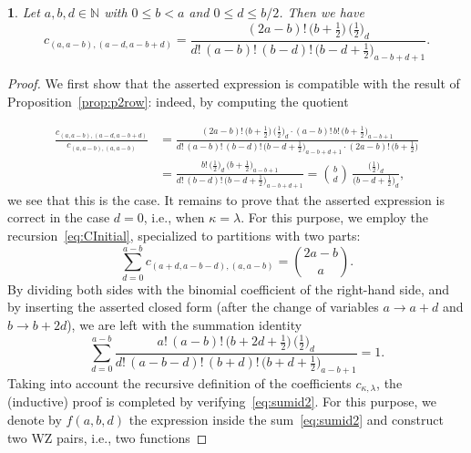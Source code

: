 \documentclass[smallextended]{svjour3}
\newtheorem{thm}{\protect\theoremname}
\providecommand{\theoremname}{Theorem}
\begin{document}
\begin{thm}\label{thm:cf2}
  Let $a,b,d\in\mathbb{N}$ with $0\leq b<a$ and $0\leq d\leq b/2$.
  Then we have
  \[
    c_{(a,a-b),(a-d,a-b+d)} = 
    \frac{(2a-b)! \, \bigl(b+\frac12\bigr) \, \bigl(\frac12\bigr)_{\!d}}
         {d! \, (a-b)! \, (b-d)! \, \bigl(b-d+\frac12\bigr)_{\!a-b+d+1}}.
  \]
\end{thm}
\begin{proof}
  We first show that the asserted expression is compatible with the result of
  Proposition~\ref{prop:p2row}: indeed, by computing the quotient
  
  \begin{align*}
    \frac{c_{(a,a-b),(a-d,a-b+d)}}{c_{(a,a-b),(a,a-b)}} &=
    \frac{(2a-b)! \, \bigl(b+\frac12\bigr) \, \bigl(\frac12\bigr)_{\!d} \cdot
      (a-b)! \, b! \, \bigl(b+\frac12\bigr)_{\!a-b+1}}
      {d! \, (a-b)! \, (b-d)! \, \bigl(b-d+\frac12\bigr)_{\!a-b+d+1} \cdot
        (2a-b)! \, \bigl(b+\frac12\bigr)} \\
    &= \frac{b! \, \bigl(\frac12\bigr)_{\!d} \, \bigl(b+\frac12\bigr)_{\!a-b+1}}
      {d! \, (b-d)! \, \bigl(b-d+\frac12\bigr)_{\!a-b+d+1}}
    = \binom{b}{d}\,\frac{\bigl(\frac12\bigr)_{\!d}}{\bigl(b-d+\frac12\bigr)_{\!d}},
  \end{align*}
  we see that this is the case. It remains to prove that the asserted
  expression is correct in the case $d=0$, i.e., when $\kappa=\lambda$.  For
  this purpose, we employ the recursion~\eqref{eq:CInitial}, specialized to
  partitions with two parts:
  \begin{equation}\label{eq:CInitial2}
    \sum_{d=0}^{a-b} c_{(a+d,a-b-d),(a,a-b)} = \binom{2a-b}{a}.
  \end{equation}
  By dividing both sides with the binomial coefficient of the right-hand side,
  and by inserting the asserted closed form (after the change of variables
  $a\to a+d$ and $b\to b+2d$), we are left with the summation identity
  \begin{equation}\label{eq:sumid2}
    \sum_{d=0}^{a-b}
    \frac{a! \, (a-b)! \, \bigl(b+2d+\frac{1}{2}\bigr) \, \bigl(\frac{1}{2}\bigr)_{\!d}}
         {d! \, (a-b-d)! \, (b+d)! \, \bigl(b+d+\frac12\bigr)_{\!a-b+1}} = 1.
  \end{equation}
  Taking into account the recursive definition of the coefficients
  $c_{\kappa,\lambda}$, the (inductive) proof is completed by
  verifying~\eqref{eq:sumid2}.
  For this purpose, we denote by $f(a,b,d)$ the expression inside the
  sum~\eqref{eq:sumid2} and construct two WZ pairs, i.e., two functions

\end{proof}
\end{document}
